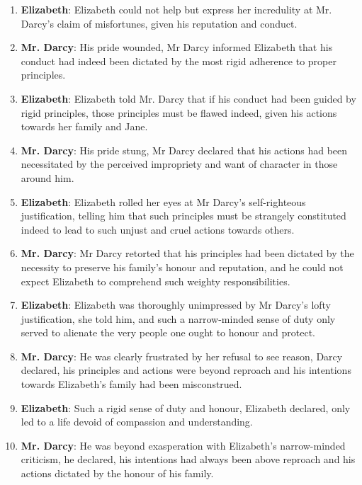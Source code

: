 \documentclass[10pt]{article}
\begin{document}
\begin{enumerate}\setlength{\itemsep}{1pt}\small

\item \textbf{Elizabeth}: Elizabeth could not help but express her incredulity at Mr. Darcy's claim of misfortunes, given his reputation and conduct.

\item \textbf{Mr. Darcy}: His pride wounded, Mr Darcy informed Elizabeth that his conduct had indeed been dictated by the most rigid adherence to proper principles.

\item \textbf{Elizabeth}: Elizabeth told Mr. Darcy that if his conduct had been guided by rigid principles, those principles must be flawed indeed, given his actions towards her family and Jane.

\item \textbf{Mr. Darcy}: His pride stung, Mr Darcy declared that his actions had been necessitated by the perceived impropriety and want of character in those around him.

\item \textbf{Elizabeth}: Elizabeth rolled her eyes at Mr Darcy's self-righteous justification, telling him that such principles must be strangely constituted indeed to lead to such unjust and cruel actions towards others.

\item \textbf{Mr. Darcy}: Mr Darcy retorted that his principles had been dictated by the necessity to preserve his family's honour and reputation, and he could not expect Elizabeth to comprehend such weighty responsibilities.

\item \textbf{Elizabeth}: Elizabeth was thoroughly unimpressed by Mr Darcy's lofty justification, she told him, and such a narrow-minded sense of duty only served to alienate the very people one ought to honour and protect.

\item \textbf{Mr. Darcy}: He was clearly frustrated by her refusal to see reason, Darcy declared, his principles and actions were beyond reproach and his intentions towards Elizabeth's family had been misconstrued.

\item \textbf{Elizabeth}: Such a rigid sense of duty and honour, Elizabeth declared, only led to a life devoid of compassion and understanding.

\item \textbf{Mr. Darcy}: He was beyond exasperation with Elizabeth's narrow-minded criticism, he declared, his intentions had always been above reproach and his actions dictated by the honour of his family.


\end{enumerate}
\end{document}
